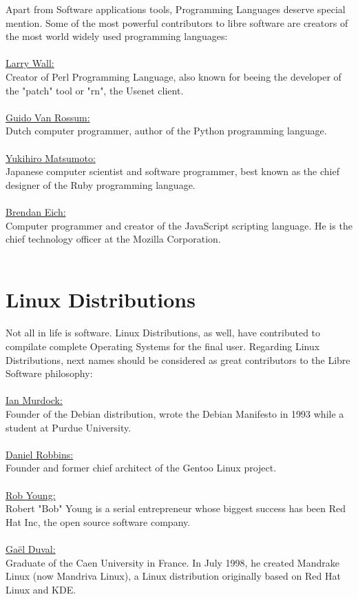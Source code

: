 \documentclass[10pt, a4paper, oneside]{report}
\begin{document}
Apart from Software applications tools, Programming Languages deserve special mention. Some of the most powerful contributors to libre software are creators of the most world widely used programming languages:\\
\\
\underline{Larry Wall:}\\
Creator of Perl Programming Language, also known for beeing the developer of the "patch" tool or "rn", the Usenet client.\\
\\
\underline{Guido Van Rossum:}\\
Dutch computer programmer, author of the Python programming language.\\
\\
\underline{Yukihiro Matsumoto:}\\
Japanese computer scientist and software programmer, best known as the chief designer of the Ruby programming language.\\
\\
\underline{Brendan Eich:}\\
Computer programmer and creator of the JavaScript scripting language. He is the chief technology officer at the Mozilla Corporation.\\
\\

\section* {Linux Distributions}

Not all in life is software. Linux Distributions, as well, have contributed to compilate complete Operating Systems for the final user.
Regarding Linux Distributions, next names should be considered as great contributors to the Libre Software philosophy:\\
\\
\underline{Ian Murdock:}\\
Founder of the Debian distribution, wrote the Debian Manifesto in 1993 while a student at Purdue University.\\
\\
\underline{Daniel Robbins:}\\
Founder and former chief architect of the Gentoo Linux project.\\
\\
\underline{Rob Young:}\\
Robert "Bob" Young is a serial entrepreneur whose biggest success has been Red Hat Inc, the open source software company.\\
\\
\underline{Gaël Duval:}\\
Graduate of the Caen University in France. In July 1998, he created Mandrake Linux (now Mandriva Linux), a Linux distribution originally based on Red Hat Linux and KDE.\\
\end{document}
